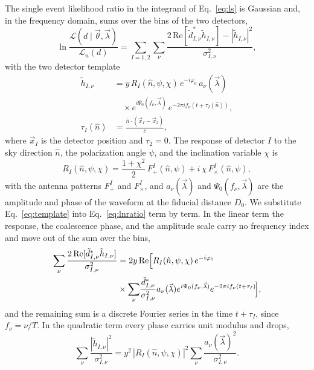 \documentclass[aps,prd,twocolumn,superscriptaddress,nofootinbib]{revtex4-2}
\begin{document}
The single event likelihood ratio in the integrand of
Eq.~\eqref{eq:ls} is Gaussian and, in the frequency domain, sums
over the bins of the two detectors,
\begin{equation}
\ln \frac{\mathcal{L}(d \mid \vec\theta, \vec\lambda)}
{\mathcal{L}_n(d)}
= \sum_{I=1,2} \sum_\nu
\frac{2\, \mathrm{Re}[ \tilde d^{*}_{I,\nu} \tilde h_{I,\nu} ]
- |\tilde h_{I,\nu}|^2}{\sigma^2_{I,\nu}},
\label{eq:lnratio}
\end{equation}
with the two detector template
\begin{equation}
\begin{aligned}
\tilde h_{I,\nu} &= y\, R_I(\hat n, \psi, \chi)\, e^{-i\varphi_0}\,
a_\nu(\vec\lambda) \\
&\quad \times e^{i\Psi_0(f_\nu, \vec\lambda)}\,
e^{-2\pi i f_\nu ( t + \tau_I(\hat n) )}, \\
\tau_I(\hat n) &= \frac{\hat n \cdot (\vec x_I - \vec x_2)}{c},
\end{aligned}
\label{eq:template}
\end{equation}
where $\vec x_I$ is the detector position and $\tau_2 = 0$. The
response of detector $I$ to the sky direction $\hat n$, the
polarization angle $\psi$, and the inclination variable $\chi$
is
\begin{equation}
R_I(\hat n, \psi, \chi) = \frac{1 + \chi^2}{2}\,
F^I_+(\hat n, \psi) + i\, \chi\, F^I_\times(\hat n, \psi),
\label{eq:response}
\end{equation}
with the antenna patterns $F^I_+$ and $F^I_\times$, and
$a_\nu(\vec\lambda)$ and $\Psi_0(f_\nu, \vec\lambda)$ are the
amplitude and phase of the waveform at the fiducial distance
$D_0$. We substitute
Eq.~\eqref{eq:template} into Eq.~\eqref{eq:lnratio} term by
term. In the linear term the response, the coalescence phase,
and the amplitude scale carry no frequency index and move out of
the sum over the bins,
\begin{align}
\sum_\nu
\frac{2\, \mathrm{Re}[ \tilde d^{*}_{I,\nu} \tilde h_{I,\nu} ]}
{\sigma^2_{I,\nu}}
&= 2 y\, \mathrm{Re}\Big[ R_I(\hat n, \psi, \chi)\,
e^{-i\varphi_0}\notag\\
&\times \sum_\nu\!
\frac{\tilde d^{*}_{I,\nu}}{\sigma^2_{I,\nu}}
a_\nu(\vec\lambda) e^{i \Psi_0(f_\nu, \vec\lambda)}
e^{-2\pi i f_\nu (t + \tau_I)}\!\Big],
\label{eq:linstep}
\end{align}
and the remaining sum is a discrete Fourier series in the time
$t + \tau_I$, since $f_\nu = \nu / T$. In the quadratic term
every phase carries unit modulus and drops,
\begin{equation}
\sum_\nu \frac{|\tilde h_{I,\nu}|^2}{\sigma^2_{I,\nu}}
= y^2\, |R_I(\hat n, \psi, \chi)|^2
\sum_\nu \frac{a_\nu(\vec\lambda)^2}{\sigma^2_{I,\nu}}.
\label{eq:quadstep}
\end{equation}
\end{document}
